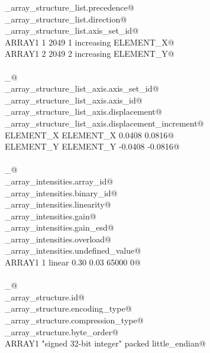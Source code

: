 \documentclass[10pt,a4paper,twoside,notitlepage]{article}
\begin{document}
\begin{flushleft}
\begin{list}{}{}
\mbox{}\verb@_array_structure_list.precedence@\\
\mbox{}\verb@_array_structure_list.direction@\\
\mbox{}\verb@_array_structure_list.axis_set_id@\\
\mbox{}\verb@ ARRAY1 1 2049 1 increasing ELEMENT_X@\\
\mbox{}\verb@ ARRAY1 2 2049 2 increasing ELEMENT_Y@\\
\mbox{}\verb@@\\
\mbox{}\verb@loop_@\\
\mbox{}\verb@_array_structure_list_axis.axis_set_id@\\
\mbox{}\verb@_array_structure_list_axis.axis_id@\\
\mbox{}\verb@_array_structure_list_axis.displacement@\\
\mbox{}\verb@_array_structure_list_axis.displacement_increment@\\
\mbox{}\verb@ ELEMENT_X ELEMENT_X 0.0408 0.0816@\\
\mbox{}\verb@ ELEMENT_Y ELEMENT_Y -0.0408 -0.0816@\\
\mbox{}\verb@@\\
\mbox{}\verb@loop_@\\
\mbox{}\verb@_array_intensities.array_id@\\
\mbox{}\verb@_array_intensities.binary_id@\\
\mbox{}\verb@_array_intensities.linearity@\\
\mbox{}\verb@_array_intensities.gain@\\
\mbox{}\verb@_array_intensities.gain_esd@\\
\mbox{}\verb@_array_intensities.overload@\\
\mbox{}\verb@_array_intensities.undefined_value@\\
\mbox{}\verb@ ARRAY1 1 linear 0.30 0.03 65000 0@\\
\mbox{}\verb@@\\
\mbox{}\verb@loop_@\\
\mbox{}\verb@_array_structure.id@\\
\mbox{}\verb@_array_structure.encoding_type@\\
\mbox{}\verb@_array_structure.compression_type@\\
\mbox{}\verb@_array_structure.byte_order@\\
\mbox{}\verb@ ARRAY1 "signed 32-bit integer" packed little_endian@\\
\mbox{}\verb@@{\NWsep}
\end{list}
\vspace{-2ex}
\end{flushleft}
\end{document}
